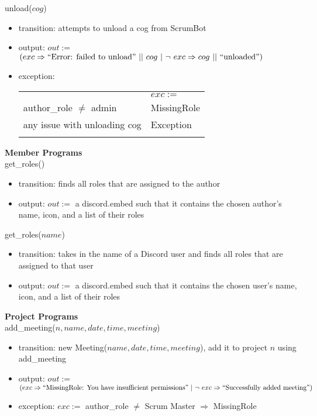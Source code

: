 \documentclass[12pt, titlepage]{article}
\begin{document}
\noindent unload($cog$)
\begin{itemize}
    \item transition: attempts to unload a cog from ScrumBot
    
    \item output: $out :=$ $(exc \Rightarrow ``\text{Error: failed to unload}"\ ||\ cog\ |\ \lnot\ exc \Rightarrow cog\ ||\ ``\text{unloaded}")$
    
    \item exception:\\
    \begin{tabular}{|p{12cm}|l|}
        \hhline{~|-|}
        \multicolumn{1}{r|}{} & \multicolumn{1}{l|}{$exc :=$}\\
        \hhline{|-|-|}
        author\_role $\neq$ admin & MissingRole\\
        \hhline{|-|-|}
        any issue with unloading cog & Exception\\
        \hhline{|-|-|}
    \end{tabular}
\end{itemize}

\noindent \textbf{Member Programs\\}
\noindent get\_roles()
\begin{itemize}
    \item transition: finds all roles that are assigned to the author
    \item output: $out :=$ a discord.embed such that it contains the chosen author's name, icon, and a list of their roles
\end{itemize}

\noindent get\_roles($name$)
\begin{itemize}
    \item transition: takes in the name of a Discord user and finds all roles that are assigned to that user
    \item output: $out :=$ a discord.embed such that it contains the chosen user's name, icon, and a list of their roles
\end{itemize}

\noindent \textbf{Project Programs\\}
\noindent add\_meeting($n, name, date, time, meeting$)
\begin{itemize}
    \item transition: new Meeting($name, date, time, meeting$), add it to project $n$ using add\_meeting
    \item output: $out :=$ $(exc \Rightarrow ``\text{MissingRole: You have insufficient permissions}"\ |\ \lnot\ exc \Rightarrow ``\text{Successfully added meeting}")$
    \item exception: $exc :=$ author\_role $\neq$ Scrum Master $\Rightarrow$ MissingRole
\end{itemize}
\end{document}
